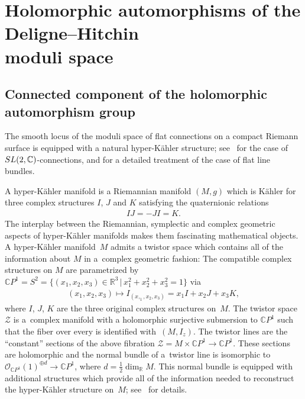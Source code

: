 \documentclass[11pt]{article}
\numberwithin{equation}{section}
\begin{document}
\setcounter{section}{2}
\setcounter{subsection}{2}
\setcounter{subsubsection}{0}
\setcounter{Theorem}{3}
\setcounter{equation}{14}
\section[Holomorphic automorphisms of the Deligne--Hitchin moduli space]{Holomorphic automorphisms of the Deligne--Hitchin\\ moduli space}

\subsection{Connected component of the holomorphic automorphism group}\label{aut0mdh}

The smooth locus of the moduli space of f\/lat connections on a compact Riemann surface is equipped with a natural hyper-K\"ahler structure; see~\cite{H} for the case of ${\rm SL}(2,\mathbb C)$-connections, and \cite{GX} for a detailed treatment of the case of f\/lat line bundles.

A hyper-K\"ahler manifold is a Riemannian manifold $(M, g)$ which is K\"ahler for three complex structures $I$, $J$ and $K$ satisfying the quaternionic relations
\begin{gather*}IJ = -JI = K .\end{gather*} The interplay between the Riemannian, symplectic and complex geometric aspects of hyper-K\"ahler manifolds makes them fascinating mathematical objects. A hyper-K\"ahler mani\-fold~$M$ admits a twistor space which contains all of the information about $M$ in a~complex geometric fashion: The compatible complex structures on $M$ are parametrized by $\mathbb CP^1 = S^2 = \big\{(x_1, x_2, x_3) \in {\mathbb R}^3 \,|\, x^2_1+x^2_2+x^2_3 = 1\big\}$ via
\begin{gather*}(x_1, x_2, x_3) \longmapsto I_{(x,_1,x_2,x_3)} = x_1 I+x_2 J+x_3 K ,\end{gather*}
where $I$, $J$, $K$ are the three original complex structures on~$M$. The twistor space $\mathcal Z$ is a~complex manifold with a holomorphic surjective submersion to $\mathbb CP^1$ such that the f\/iber over every  is identif\/ied with~$(M, I_z)$. The twistor lines are the ``constant'' sections of the above f\/ibration ${\mathcal Z} = M\times\mathbb CP^1 \longrightarrow {\mathbb C} P^1$. These sections are holomorphic and the normal bundle of a~twistor line is isomorphic to ${\mathcal O}_{\mathbb CP^1}(1)^{\oplus d} \longrightarrow \mathbb CP^1$, where $d = \frac{1}{2}\dim_{\mathbb R}M$. This normal bundle is equipped with additional structures which provide all of the information needed to reconstruct the hyper-K\"ahler structure on~$M$; see~\cite{HKLR} for details.
\end{document}
